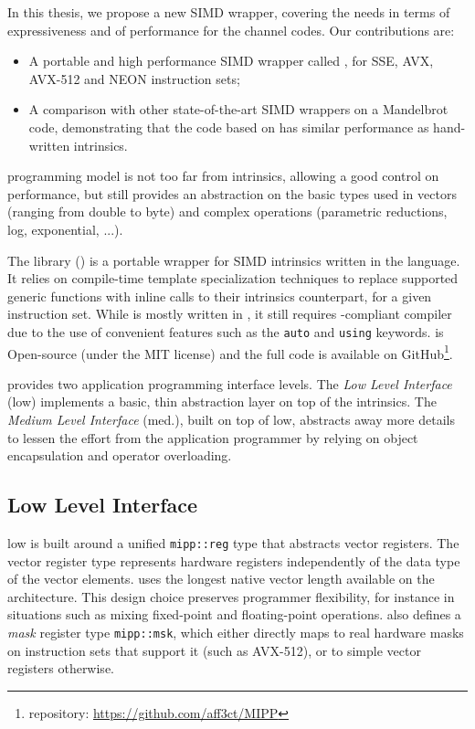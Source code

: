 In this thesis, we propose a new \Cxx SIMD wrapper, covering the needs in terms
of expressiveness and of performance for the channel codes. Our contributions
are:
\begin{itemize}
  \item A portable and high performance  \Cxx SIMD wrapper called \MIPP, for
    SSE, AVX, AVX-512 and NEON instruction sets;
  \item A comparison with other state-of-the-art SIMD wrappers on a Mandelbrot
    code, demonstrating that the code based on \MIPP has similar performance as
    hand-written intrinsics.
\end{itemize}
\MIPP programming model is not too far from intrinsics, allowing a good control
on performance, but still provides an abstraction on the basic types used in
vectors (ranging from double to byte) and complex operations (parametric
reductions, log, exponential, ...).

The \longMIPP library (\MIPP) is a portable wrapper for SIMD intrinsics written
in the \Cxx language. It relies on \Cxx compile-time template specialization
techniques to replace supported generic functions with inline calls to their
intrinsics counterpart, for a given instruction set. While \MIPP is mostly
written in , it still requires -compliant compiler due to the
use of convenient features such as the \verb|auto| and \verb|using| keywords.
\MIPP is Open-source (under the MIT license) and the full code is available on
GitHub\footnote{\MIPP repository: \url{https://github.com/aff3ct/MIPP}}.

\MIPP provides two application programming interface levels. The
\emph{Low Level Interface} (low) implements a basic, thin abstraction layer on
top of the intrinsics. The \emph{Medium Level Interface} (med.), built on top of
\MIPP low, abstracts away more details to lessen the effort from the application
programmer by relying on object encapsulation and operator overloading.

\subsection{Low Level Interface}

\MIPP low is built around a unified \verb|mipp::reg| type that abstracts vector
registers. The vector register type represents hardware registers independently
of the data type of the vector elements. \MIPP uses the longest native vector
length available on the architecture. This design choice preserves programmer
flexibility, for instance in situations such as mixing fixed-point and
floating-point operations. \MIPP also defines a \emph{mask} register type
\verb|mipp::msk|, which either directly maps to real hardware masks on
instruction sets that support it (such as AVX-512), or to simple vector
registers otherwise.


